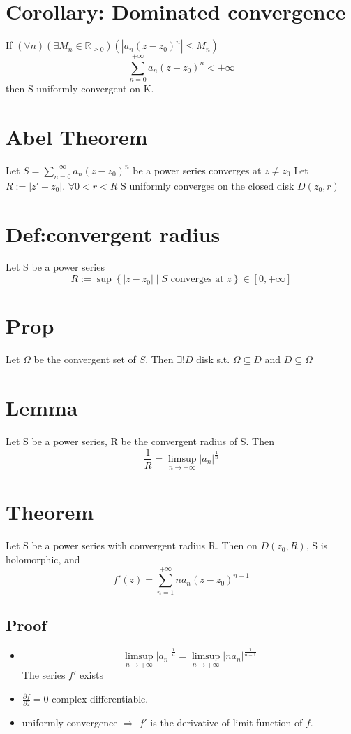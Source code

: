\documentclass{book}
\newcommand{\abs}[1]{\left\lvert #1 \right\rvert}
\begin{document}
\section{Corollary: Dominated convergence}
If $(\forall n)(\exists M_n\in \mathbb R_{\geq 0})(\abs{a_n(z-z_0)^n}\leq M_n)$
$$\sum\limits_{n=0}^{+\infty}a_n(z-z_0)^n<+\infty$$
then S uniformly convergent on K.
\section{Abel Theorem}
Let $S=\sum\limits_{n=0}^{+\infty}a_n(z-z_0)^n$ be a power series converges at $z\neq z_0$ Let $R:=\abs{z'-z_0}$. $\forall 0<r<R$ S uniformly converges on the closed disk $\overline D(z_0,r)$
\section{Def:convergent radius}
Let S be a power series
$$R:=\sup\left\{\abs{z-z_0}\mid S \text{ converges at }z\right\}\in [0,+\infty]$$
\section{Prop}
Let $\Omega$ be the convergent set of $S$. Then $\exists! D$ disk s.t. $\Omega\subseteq\overline D$ and $D\subseteq \Omega$
\section{Lemma}
Let S be a power series, R be the convergent radius of S. Then 
$$\frac{1}R=\limsup\limits_{n\to +\infty}\abs{a_n}^{\frac{1}n}$$
\section{Theorem}
Let S be a power series with convergent radius R. Then on $D(z_0,R)$, S is holomorphic, and $$f'(z)=\sum\limits_{n=1}^{+\infty}na_n(z-z_0)^{n-1}$$
\subsection*{Proof}
\begin{itemize}
    \item $$\limsup\limits_{n\to +\infty}\abs{a_n}^{\frac{1}n}=\limsup\limits_{n\to +\infty}\abs{na_n}^{\frac{1}{n-1}}$$The series $f'$ exists
    \item $\frac{\partial f}{\partial \overline z}=0$ complex differentiable.
    \item uniformly convergence $\Rightarrow$ $f'$ is the derivative of limit function of $f$.
\end{itemize}
\end{document}

